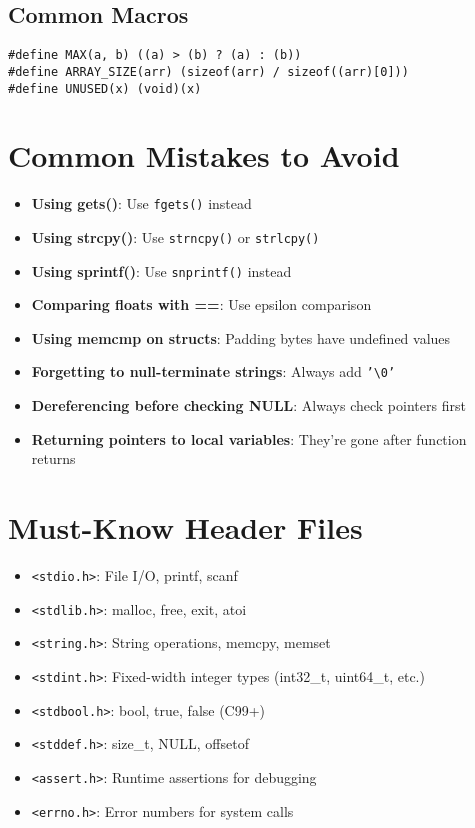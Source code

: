 \documentclass[10pt,openany]{book}
\begin{document}
\subsection*{Common Macros}
\begin{lstlisting}
#define MAX(a, b) ((a) > (b) ? (a) : (b))
#define ARRAY_SIZE(arr) (sizeof(arr) / sizeof((arr)[0]))
#define UNUSED(x) (void)(x)
\end{lstlisting}

\section*{Common Mistakes to Avoid}

\begin{itemize}
    \item \textbf{Using gets()}: Use \texttt{fgets()} instead
    \item \textbf{Using strcpy()}: Use \texttt{strncpy()} or \texttt{strlcpy()}
    \item \textbf{Using sprintf()}: Use \texttt{snprintf()} instead
    \item \textbf{Comparing floats with ==}: Use epsilon comparison
    \item \textbf{Using memcmp on structs}: Padding bytes have undefined values
    \item \textbf{Forgetting to null-terminate strings}: Always add \texttt{'\textbackslash 0'}
    \item \textbf{Dereferencing before checking NULL}: Always check pointers first
    \item \textbf{Returning pointers to local variables}: They're gone after function returns
\end{itemize}

\section*{Must-Know Header Files}

\begin{itemize}
    \item \texttt{<stdio.h>}: File I/O, printf, scanf
    \item \texttt{<stdlib.h>}: malloc, free, exit, atoi
    \item \texttt{<string.h>}: String operations, memcpy, memset
    \item \texttt{<stdint.h>}: Fixed-width integer types (int32\_t, uint64\_t, etc.)
    \item \texttt{<stdbool.h>}: bool, true, false (C99+)
    \item \texttt{<stddef.h>}: size\_t, NULL, offsetof
    \item \texttt{<assert.h>}: Runtime assertions for debugging
    \item \texttt{<errno.h>}: Error numbers for system calls
\end{itemize}
\end{document}

